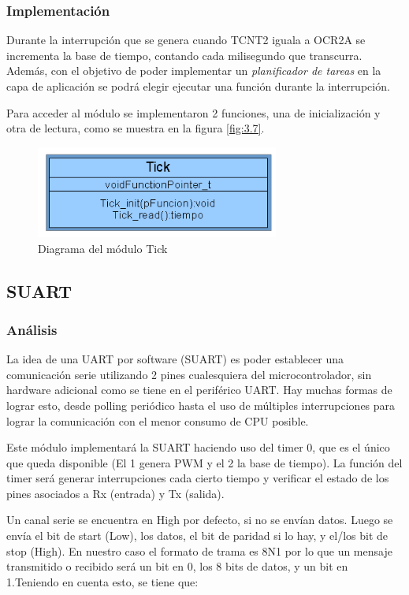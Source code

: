 \subsubsection{Implementación}

Durante la interrupción que se genera cuando TCNT2 iguala a OCR2A se incrementa la base de tiempo, contando cada milisegundo que transcurra. Además, con el objetivo de poder implementar un \textit{planificador de tareas} en la capa de aplicación se podrá elegir ejecutar una función durante la interrupción.

Para acceder al módulo se implementaron 2 funciones, una de inicialización y otra de lectura, como se muestra en la figura \ref{fig:3.7}.

\begin{figure}[!ht]
	\centering
	\includegraphics[width=8cm,scale=1]{resources/3_7-moduloTick.png}
	\caption{Diagrama del módulo Tick}
	\label{fig:\thefigure}
\end{figure}

\subsection{SUART}
\subsubsection{Análisis}
La idea de una UART por software (SUART) es poder establecer una comunicación serie utilizando 2 pines cualesquiera del microcontrolador, sin hardware adicional como se tiene en el periférico UART. Hay muchas formas de lograr esto, desde polling periódico hasta el uso de múltiples interrupciones para lograr la comunicación con el menor consumo de CPU posible. 

Este módulo implementará la SUART haciendo uso del timer 0, que es el único que queda disponible (El 1 genera PWM y el 2 la base de tiempo). La función del timer será generar interrupciones cada cierto tiempo y verificar el estado de los pines asociados a Rx (entrada) y Tx (salida). 

Un canal serie se encuentra en High por defecto, si no se envían datos. Luego se envía el bit de start (Low), los datos, el bit de paridad si lo hay, y el/los bit de stop (High). En nuestro caso el formato de trama es 8N1 por lo que un mensaje transmitido o recibido será un bit en 0, los 8 bits de datos, y un bit en 1.Teniendo en cuenta esto, se tiene que:

